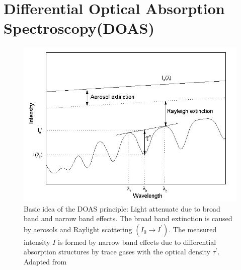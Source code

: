 \documentclass  [
  paper    = a4,
  BCOR     = 10mm,
  twoside,
  fontsize = 12pt,
  fleqn,
  toc      = bibnumbered,
  toc      = listofnumbered,
  numbers  = noendperiod,
  headings = normal,
  listof   = leveldown,
  version  = 3.03
]                                       {scrreprt}
\begin{document}
	\section{Differential Optical Absorption Spectroscopy(DOAS)\label{DOAS}}
		\begin{figure}
			\centering
			\includegraphics[width=0.8\linewidth]{Bilder/Simon/Bilder_Tung/DOAS_Intensity}
			\caption{Basic idea of the DOAS principle: Light attenuate due to broad band and narrow band effects. The broad band extinction is caused by aerosols and Raylight scattering $\left(I_0\rightarrow I^{'}\right)$. The measured intensity $I$ is formed by narrow band effects due to differential absorption structures by trace gases with the optical density $\tau^{'}$. Adapted from \cite{kern2009spectroscopic}}
			\label{fig:doasintensity}
		\end{figure}
		
\end{document}
